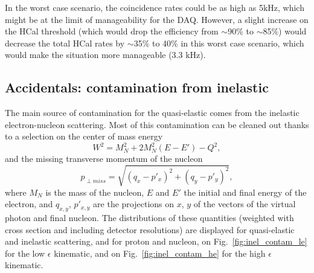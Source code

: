 In the worst case scenario, the coincidence rates could be as high as 5kHz, which might be at the limit of manageability for the DAQ.
However, a slight increase on the HCal threshold (which would drop the efficiency from $\sim$90\% to $\sim$85\%) would decrease the total HCal rates by $\sim$35\% to 40\% in this worst case scenario, which would make the situation more manageable (3.3 kHz).

\subsection{Accidentals: contamination from inelastic}

The main source of contamination for the quasi-elastic comes from the inelastic electron-nucleon scattering. Most of this contamination can be cleaned out thanks to a selection on the center of mass energy
%
\begin{equation}
  W^2 = M_{N}^2+2M_{N}^{2}(E-E')-Q^2, %
\end{equation}
%
and the missing transverse momentum of the nucleon
%
\begin{equation}
  p_{\perp miss} = \sqrt{(q_{x}-p'_{x})^2+(q_{y}-p'_{y})^2},
\end{equation}
%
where $M_N$ is the mass of the nucleon, $E$ and $E'$ the initial and final energy of the electron, and $q_{x,y}$, $p'_{x, y}$ are the projections on $x$, $y$ of the vectors of the virtual photon and final nucleon.
The distributions of these quantities (weighted with cross section and including detector resolutions) are displayed for quasi-elastic and inelastic scattering, and for proton and nucleon, on Fig.~\ref{fig:inel_contam_le} for the low $\epsilon$ kinematic, and on Fig.~\ref{fig:inel_contam_he} for the high $\epsilon$ kinematic.
%
